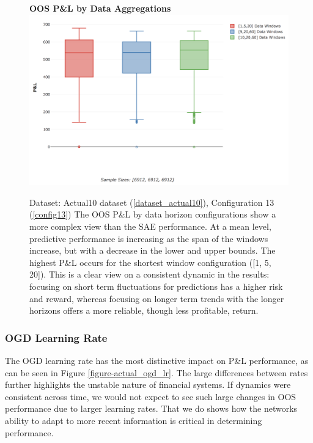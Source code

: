 \documentclass[a4paper,11pt,oneside]{article}
\theoremstyle{plain}
\theoremstyle{definition}
\begin{document}
	
	
		\begin{figure}[H]
		\centering 
		\textbf{OOS P\&L by Data Aggregations}
		\includegraphics[scale=0.4]{images/results/data/actual_aggregation_pl.png}
		\caption[OOS P\&L by Data Aggregations]
		{
			Dataset: Actual10 dataset (\ref{dataset_actual10}), Configuration 13 (\ref{config13})
			\newline The OOS P\&L by data horizon configurations show a more complex view than the SAE performance. At a mean level, predictive performance is increasing as the span of the windows increase, but with a decrease in the lower and upper bounds. The highest P\&L occurs for the shortest window configuration ([1, 5, 20]). This is a clear view on a consistent dynamic in the results: focusing on short term fluctuations for predictions has a higher risk and reward, whereas focusing on longer term trends with the longer horizons offers a more reliable, though less profitable, return.}
		\label{figure-actual_aggregation_pl}
	\end{figure}
	
	\subsubsection{OGD Learning Rate}
	
	The OGD learning rate has the most distinctive impact on P\&L performance, as can be seen in Figure \ref{figure-actual_ogd_lr}. The large differences between rates further highlights the unstable nature of financial systems. If dynamics were consistent across time, we would not expect to see such large changes in OOS performance due to larger learning rates. That we do shows how the networks ability to adapt to more recent information is critical in determining performance. \newline
	
\end{document}
